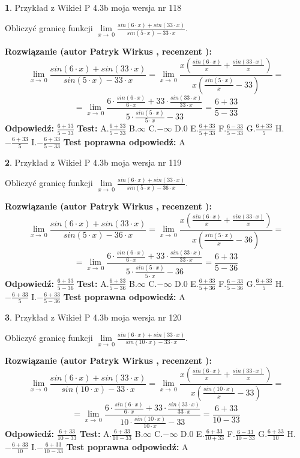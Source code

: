 \documentclass[12pt, a4paper]{article}
\theoremstyle{definition} %
\newtheorem{zad}{}
\newcommand{\zadStart}[1]{\begin{zad}#1\newline}
\newcommand{\zadStop}{\end{zad}}
\newcommand{\rozwStart}[2]{\noindent \textbf{Rozwiązanie (autor #1 , recenzent #2): }\newline}
\newcommand{\rozwStop}{\newline}
\newcommand{\odpStart}{\noindent \textbf{Odpowiedź:}\newline}
\newcommand{\odpStop}{\newline}
\newcommand{\testStart}{\noindent \textbf{Test:}\newline}
\newcommand{\testStop}{\newline}
\newcommand{\kluczStart}{\noindent \textbf{Test poprawna odpowiedź:}\newline}
\newcommand{\kluczStop}{\newline}
\begin{document}
\zadStart{Przykład z Wikieł P 4.3b moja wersja nr 118}


Obliczyć granicę funkcji $\lim\limits_{x\to\ 0}\frac{sin(6 \cdot x)+sin(33 \cdot x)}{sin(5 \cdot x)-33 \cdot x}$.
\zadStop
\rozwStart{Patryk Wirkus}{}
$$\lim\limits_{x\to\ 0}\frac{sin(6 \cdot x)+sin(33 \cdot x)}{sin(5 \cdot x)-33 \cdot x}=\lim\limits_{x\to\ 0}\frac{x(\frac{sin(6 \cdot x)}{x}+\frac{sin(33 \cdot x)}{x})}{x(\frac{sin(5 \cdot x)}{x}-33)}=$$
$$=\lim\limits_{x\to\ 0}\frac{6 \cdot \frac{sin(6 \cdot x)}{6 \cdot x}+33 \cdot \frac{sin(33 \cdot x)}{33 \cdot x}}{5 \cdot \frac{sin(5 \cdot x)}{5 \cdot x}-33}=\frac{6+33}{5-33}$$
\rozwStop
\odpStart
$\frac{6+33}{5-33}$
\odpStop
\testStart
A.$\frac{6+33}{5-33}$
B.$\infty$
C.$-\infty$
D.$0$
E.$\frac{6+33}{5+33}$
F.$\frac{6-33}{5-33}$
G.$\frac{6+33}{5}$
H.$-\frac{6+33}{5}$
I.$-\frac{6+33}{5-33}$
\testStop
\kluczStart
A
\kluczStop



\zadStart{Przykład z Wikieł P 4.3b moja wersja nr 119}


Obliczyć granicę funkcji $\lim\limits_{x\to\ 0}\frac{sin(6 \cdot x)+sin(33 \cdot x)}{sin(5 \cdot x)-36 \cdot x}$.
\zadStop
\rozwStart{Patryk Wirkus}{}
$$\lim\limits_{x\to\ 0}\frac{sin(6 \cdot x)+sin(33 \cdot x)}{sin(5 \cdot x)-36 \cdot x}=\lim\limits_{x\to\ 0}\frac{x(\frac{sin(6 \cdot x)}{x}+\frac{sin(33 \cdot x)}{x})}{x(\frac{sin(5 \cdot x)}{x}-36)}=$$
$$=\lim\limits_{x\to\ 0}\frac{6 \cdot \frac{sin(6 \cdot x)}{6 \cdot x}+33 \cdot \frac{sin(33 \cdot x)}{33 \cdot x}}{5 \cdot \frac{sin(5 \cdot x)}{5 \cdot x}-36}=\frac{6+33}{5-36}$$
\rozwStop
\odpStart
$\frac{6+33}{5-36}$
\odpStop
\testStart
A.$\frac{6+33}{5-36}$
B.$\infty$
C.$-\infty$
D.$0$
E.$\frac{6+33}{5+36}$
F.$\frac{6-33}{5-36}$
G.$\frac{6+33}{5}$
H.$-\frac{6+33}{5}$
I.$-\frac{6+33}{5-36}$
\testStop
\kluczStart
A
\kluczStop



\zadStart{Przykład z Wikieł P 4.3b moja wersja nr 120}


Obliczyć granicę funkcji $\lim\limits_{x\to\ 0}\frac{sin(6 \cdot x)+sin(33 \cdot x)}{sin(10 \cdot x)-33 \cdot x}$.
\zadStop
\rozwStart{Patryk Wirkus}{}
$$\lim\limits_{x\to\ 0}\frac{sin(6 \cdot x)+sin(33 \cdot x)}{sin(10 \cdot x)-33 \cdot x}=\lim\limits_{x\to\ 0}\frac{x(\frac{sin(6 \cdot x)}{x}+\frac{sin(33 \cdot x)}{x})}{x(\frac{sin(10 \cdot x)}{x}-33)}=$$
$$=\lim\limits_{x\to\ 0}\frac{6 \cdot \frac{sin(6 \cdot x)}{6 \cdot x}+33 \cdot \frac{sin(33 \cdot x)}{33 \cdot x}}{10 \cdot \frac{sin(10 \cdot x)}{10 \cdot x}-33}=\frac{6+33}{10-33}$$
\rozwStop
\odpStart
$\frac{6+33}{10-33}$
\odpStop
\testStart
A.$\frac{6+33}{10-33}$
B.$\infty$
C.$-\infty$
D.$0$
E.$\frac{6+33}{10+33}$
F.$\frac{6-33}{10-33}$
G.$\frac{6+33}{10}$
H.$-\frac{6+33}{10}$
I.$-\frac{6+33}{10-33}$
\testStop
\kluczStart
A
\kluczStop
\end{document}
